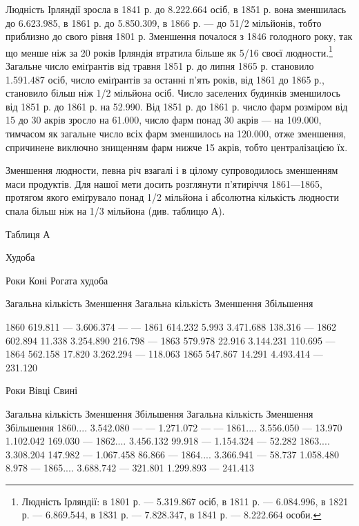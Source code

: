 Людність Ірляндії зросла в 1841 р. до 8.222.664 осіб, в 1851 р.
вона зменшилась до 6.623.985, в 1861 р. до 5.850.309, в 1866 р. —
до 51/2 мільйонів, тобто приблизно до свого рівня 1801 р. Зменшення
почалося з 1846 голодного року, так що менше ніж за
20 років Ірляндія втратила більше як 5/16 своєї людности.\footnote{
Людність Ірляндії: в 1801 р. — 5.319.867 осіб, в 1811 р. — 6.084.996,
в 1821 р. — 6.869.544, в 1831 р. — 7.828.347, в 1841 р. — 8.222.664 особи.
}
Загальне число еміґрантів від травня 1851 р. до липня 1865 р.
становило 1.591.487 осіб, число еміґрантів за останні п’ять років,
від 1861 до 1865 р., становило більш ніж 1/2 мільйона осіб. Число
заселених будинків зменшилось від 1851 р. до 1861 р. на 52.990.
Від 1851 р. до 1861 р. число фарм розміром від 15 до 30 акрів зросло
на 61.000, число фарм понад 30 акрів — на 109.000, тимчасом
як загальне число всіх фарм зменшилось на 120.000, отже зменшення,
спричинене виключно знищенням фарм нижче 15 акрів,
тобто централізацією їх.

Зменшення людности, певна річ взагалі і в цілому супроводилось
зменшенням маси продуктів. Для нашої мети досить
розглянути п’ятиріччя 1861—1865, протягом якого еміґрувало
понад 1/2 мільйона і абсолютна кількість людности спала
більш ніж на 1/3 мільйона (див. таблицю А).

Таблиця А

Худоба

Роки    Коні    Рогата худоба

    Загальна кількість    Зменшення    Загальна кількість    Зменшення    Збільшення

1860                619.811              —                    3.606.374                       —     
                 —
1861                614.232           5.993                 3.471.688                 138.316       
          —
1862                602.894          11.338                3.254.890                 216.798        
         —
1863                579.978          22.916                3.144.231                 110.695        
         —
1864                562.158          17.820                3.262.294                       —        
        118.063
1865                547.867          14.291                4.493.414                       —        
         231.120

Роки    Вівці            Свині

    Загальна кількість    Зменшення    Збільшення    Загальна кількість    Зменшення    Збільшення
1860....    3.542.080         —                   —              1.271.072          —               
      —
1861....    3.556.050         —               13.970         1.102.042       169.030               —
1862....    3.456.132      99.918             —              1.154.324         —                  
52.282
1863....    3.308.204     147.982            —              1.067.458        86.866                —
1864....    3.366.941        —                58.737         1.058.480       8.978                  
—
1865....    3.688.742        —                321.801       1.299.893         —                
241.413